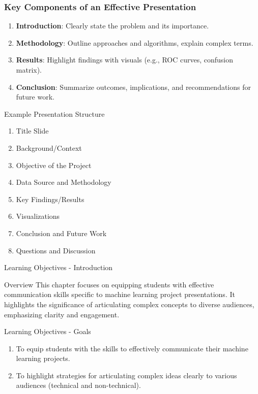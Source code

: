 \documentclass[aspectratio=169]{beamer}
\begin{document}
\begin{frame}[fragile]
    \frametitle{Key Components of an Effective Presentation}
    \begin{enumerate}
        \item \textbf{Introduction}: Clearly state the problem and its importance.
        \item \textbf{Methodology}: Outline approaches and algorithms, explain complex terms.
        \item \textbf{Results}: Highlight findings with visuals (e.g., ROC curves, confusion matrix).
        \item \textbf{Conclusion}: Summarize outcomes, implications, and recommendations for future work.
    \end{enumerate}

    \begin{block}{Example Presentation Structure}
        \begin{enumerate}
            \item Title Slide
            \item Background/Context
            \item Objective of the Project
            \item Data Source and Methodology
            \item Key Findings/Results
            \item Visualizations
            \item Conclusion and Future Work
            \item Questions and Discussion
        \end{enumerate}
    \end{block}
\end{frame}

\begin{frame}[fragile]{Learning Objectives - Introduction}
    \begin{block}{Overview}
        This chapter focuses on equipping students with effective communication skills specific to machine learning project presentations. 
        It highlights the significance of articulating complex concepts to diverse audiences, emphasizing clarity and engagement.
    \end{block}
\end{frame}

\begin{frame}[fragile]{Learning Objectives - Goals}
    \begin{enumerate}
        \item To equip students with the skills to effectively communicate their machine learning projects.
        \item To highlight strategies for articulating complex ideas clearly to various audiences (technical and non-technical).
    \end{enumerate}
\end{frame}
\end{document}
